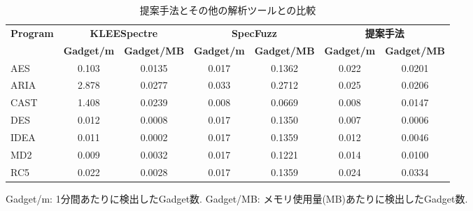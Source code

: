 \begin{table}[htbp]
  \centering
  \caption{提案手法とその他の解析ツールとの比較}
  \label{all_comparison}
  \begin{tabular}{l|cc|cc|cc}
    \hline
    \multirow{2}{*}{\textbf{Program}} & 
    \multicolumn{2}{c|}{\textbf{KLEESpectre}} & 
    \multicolumn{2}{c|}{\textbf{SpecFuzz}} & 
    \multicolumn{2}{c}{\textbf{提案手法}} \\
    \cline{2-7}
    & \textbf{Gadget/m} & \textbf{Gadget/MB} & 
    \textbf{Gadget/m} &  \textbf{Gadget/MB} & 
    \textbf{Gadget/m} &  \textbf{Gadget/MB} \\
    \hline
    AES   & 0.103 & 0.0135  & 0.017 & 0.1362 & 0.022 & 0.0201 \\
    ARIA  & 2.878 & 0.0277  & 0.033 & 0.2712 & 0.025 & 0.0206 \\
    CAST  & 1.408 & 0.0239  & 0.008 & 0.0669 & 0.008 & 0.0147 \\
    DES   & 0.012 & 0.0008  & 0.017 & 0.1350 & 0.007 & 0.0006 \\
    IDEA  & 0.011 & 0.0002  & 0.017 & 0.1359 & 0.012 & 0.0046 \\
    MD2   & 0.009 & 0.0032  & 0.017 & 0.1221 & 0.014 & 0.0100 \\
    RC5   & 0.022 & 0.0028  & 0.017 & 0.1359 & 0.024 & 0.0334 \\
    \hline
  \end{tabular}
    \begin{tablenotes}
      \footnotesize 
    \item Gadget/m: 1分間あたりに検出したGadget数. Gadget/MB: メモリ使用量(MB)あたりに検出したGadget数.
    \end{tablenotes}
\end{table}

